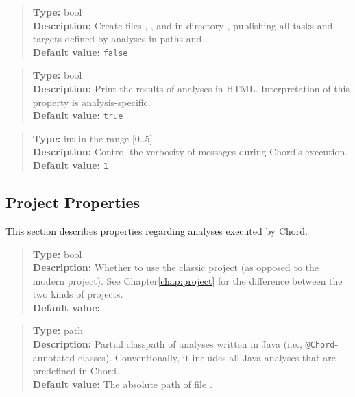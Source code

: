 \begin{quote}
{\bf Type:} bool \\
{\bf Description:} Create files , , and 
 in directory , publishing all tasks and targets defined by analyses in paths  and
 .  \\
{\bf Default value:} {\tt false}
\end{quote}

\begin{quote}
{\bf Type:} bool \\
{\bf Description:} Print the results of analyses in HTML.  Interpretation of this property is analysis-specific.  \\
{\bf Default value:} {\tt true}
\end{quote}

\begin{quote}
{\bf Type:} int in the range [0..5]  \\
{\bf Description:} Control the verbosity of messages during Chord's execution.  \\
{\bf Default value:} {\tt 1}
\end{quote}

\subsection{Project Properties}
\label{sec:project-props}

This section describes properties regarding analyses executed by Chord.

\begin{quote}
{\bf Type:} bool \\
{\bf Description:} Whether to use the classic project (as opposed to the modern
project).  See Chapter\ref{chap:project} for the difference
 between the two kinds of projects. \\
{\bf Default value:} 
\end{quote}

\begin{quote}
{\bf Type:} path \\
{\bf Description:} Partial classpath of analyses written in Java (i.e., {\tt @Chord}-annotated classes).
Conventionally, it includes all Java analyses that are predefined in Chord.  \\
{\bf Default value:} The absolute path of file .
\end{quote}

